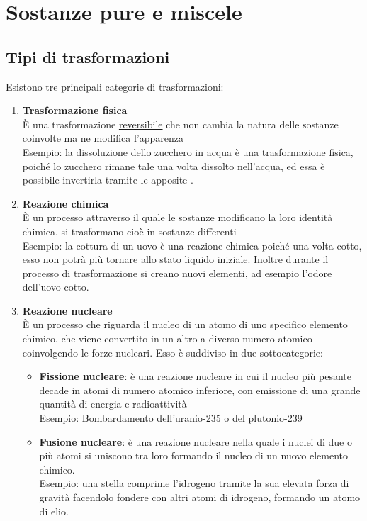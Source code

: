\documentclass{article}
\begin{document}
\section{Sostanze pure e miscele}

\subsection{Tipi di trasformazioni}
Esistono tre principali categorie di trasformazioni:
\begin{enumerate}[label=\textbf{\arabic*.}]
    \item \textbf{Trasformazione fisica}\\
        È una trasformazione \underline{reversibile} che non cambia la natura delle sostanze
        coinvolte ma ne modifica l'apparenza \\
        Esempio: la dissoluzione dello zucchero in acqua è una trasformazione fisica, poiché
        lo zucchero rimane tale una volta dissolto nell'acqua, ed essa è possibile invertirla
        tramite le apposite \hyperlink{tecniche di separazione}{}.
    \item \textbf{Reazione chimica}\\
        È un processo attraverso il quale le sostanze modificano la loro identità chimica,
        si trasformano cioè in sostanze differenti \\
        Esempio: la cottura di un uovo è una reazione chimica poiché una volta cotto, esso non
        potrà più tornare allo stato liquido iniziale. Inoltre durante il processo di trasformazione
        si creano nuovi elementi, ad esempio l'odore dell'uovo cotto.
    \item \textbf{Reazione nucleare}\\
        È un processo che riguarda il nucleo di un atomo di uno specifico elemento chimico,
        che viene convertito in un altro a diverso numero atomico coinvolgendo le forze nucleari.
        Esso è suddiviso in due sottocategorie:
        \begin{itemize}
            \item \textbf{Fissione nucleare}: è una reazione nucleare in cui il nucleo più pesante
            decade in atomi di numero atomico inferiore, con emissione di una grande quantità
            di energia e radioattività\\
            Esempio: Bombardamento dell'uranio-235 o del plutonio-239
            \item \textbf{Fusione nucleare}: è una reazione nucleare nella quale i nuclei di due o più
            atomi si uniscono tra loro formando il nucleo di un nuovo elemento chimico.\\
            Esempio: una stella comprime l'idrogeno tramite la sua elevata forza di gravità
            facendolo fondere con altri atomi di idrogeno, formando un atomo di elio.
        \end{itemize}
        
\end{enumerate}
\end{document}
